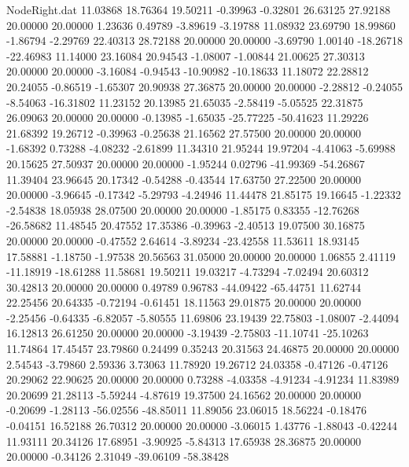\begin{filecontents}{NodeRight.dat}
  11.03868   18.76364   19.50211    -0.39963   -0.32801   26.63125   27.92188   20.00000   20.00000    1.23636    0.49789   -3.89619   -3.19788
  11.08932   23.69790   18.99860    -1.86794   -2.29769   22.40313   28.72188   20.00000   20.00000   -3.69790    1.00140  -18.26718  -22.46983
  11.14000   23.16084   20.94543    -1.08007   -1.00844   21.00625   27.30313   20.00000   20.00000   -3.16084   -0.94543  -10.90982  -10.18633
  11.18072   22.28812   20.24055    -0.86519   -1.65307   20.90938   27.36875   20.00000   20.00000   -2.28812   -0.24055   -8.54063  -16.31802
  11.23152   20.13985   21.65035    -2.58419   -5.05525   22.31875   26.09063   20.00000   20.00000   -0.13985   -1.65035  -25.77225  -50.41623
  11.29226   21.68392   19.26712    -0.39963   -0.25638   21.16562   27.57500   20.00000   20.00000   -1.68392    0.73288   -4.08232   -2.61899
  11.34310   21.95244   19.97204    -4.41063   -5.69988   20.15625   27.50937   20.00000   20.00000   -1.95244    0.02796  -41.99369  -54.26867
  11.39404   23.96645   20.17342    -0.54288   -0.43544   17.63750   27.22500   20.00000   20.00000   -3.96645   -0.17342   -5.29793   -4.24946
  11.44478   21.85175   19.16645    -1.22332   -2.54838   18.05938   28.07500   20.00000   20.00000   -1.85175    0.83355  -12.76268  -26.58682
  11.48545   20.47552   17.35386    -0.39963   -2.40513   19.07500   30.16875   20.00000   20.00000   -0.47552    2.64614   -3.89234  -23.42558
  11.53611   18.93145   17.58881    -1.18750   -1.97538   20.56563   31.05000   20.00000   20.00000    1.06855    2.41119  -11.18919  -18.61288
  11.58681   19.50211   19.03217    -4.73294   -7.02494   20.60312   30.42813   20.00000   20.00000    0.49789    0.96783  -44.09422  -65.44751
  11.62744   22.25456   20.64335    -0.72194   -0.61451   18.11563   29.01875   20.00000   20.00000   -2.25456   -0.64335   -6.82057   -5.80555
  11.69806   23.19439   22.75803    -1.08007   -2.44094   16.12813   26.61250   20.00000   20.00000   -3.19439   -2.75803  -11.10741  -25.10263
  11.74864   17.45457   23.79860     0.24499    0.35243   20.31563   24.46875   20.00000   20.00000    2.54543   -3.79860    2.59336    3.73063
  11.78920   19.26712   24.03358    -0.47126   -0.47126   20.29062   22.90625   20.00000   20.00000    0.73288   -4.03358   -4.91234   -4.91234
  11.83989   20.20699   21.28113    -5.59244   -4.87619   19.37500   24.16562   20.00000   20.00000   -0.20699   -1.28113  -56.02556  -48.85011
  11.89056   23.06015   18.56224    -0.18476   -0.04151   16.52188   26.70312   20.00000   20.00000   -3.06015    1.43776   -1.88043   -0.42244
  11.93111   20.34126   17.68951    -3.90925   -5.84313   17.65938   28.36875   20.00000   20.00000   -0.34126    2.31049  -39.06109  -58.38428

\end{filecontents}
